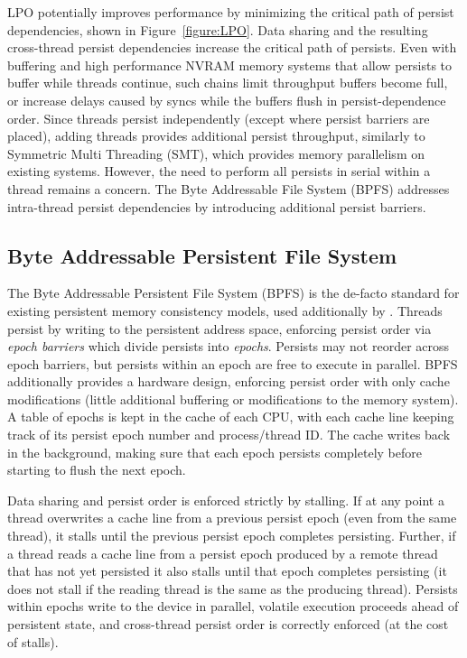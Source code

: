 
LPO potentially improves performance by minimizing the critical path of persist dependencies, shown in Figure~\ref{figure:LPO}.
Data sharing and the resulting cross-thread persist dependencies increase the critical path of persists.
Even with buffering and high performance NVRAM memory systems that allow persists to buffer while threads continue, such chains limit throughput buffers become full, or increase delays caused by syncs while the buffers flush in persist-dependence order.
Since threads persist independently (except where persist barriers are placed), adding threads provides additional persist throughput, similarly to Symmetric Multi Threading (SMT), which provides memory parallelism on existing systems.
However, the need to perform all persists in serial within a thread remains a concern.
The Byte Addressable File System (BPFS) addresses intra-thread persist dependencies by introducing additional persist barriers.

\subsection{Byte Addressable Persistent File System}
\label{sec:PMC:PersistenceModels:BPFS}

The Byte Addressable Persistent File System (BPFS) \cite{ConditNightingale09} is the de-facto standard for existing persistent memory consistency models, used additionally by \cite{CoburnCaulfield11, FangHsiao11, VenkataramanTolia11}.
Threads persist by writing to the persistent address space, enforcing persist order via \emph{epoch barriers} which divide persists into \emph{epochs}.
Persists may not reorder across epoch barriers, but persists within an epoch are free to execute in parallel.
BPFS additionally provides a hardware design, enforcing persist order with only cache modifications (little additional buffering or modifications to the memory system).
A table of epochs is kept in the cache of each CPU, with each cache line keeping track of its persist epoch number and process/thread ID.
The cache writes back in the background, making sure that each epoch persists completely before starting to flush the next epoch.

Data sharing and persist order is enforced strictly by stalling.
If at any point a thread overwrites a cache line from a previous persist epoch (even from the same thread), it stalls until the previous persist epoch completes persisting.
Further, if a thread reads a cache line from a persist epoch produced by a remote thread that has not yet persisted it also stalls until that epoch completes persisting (it does not stall if the reading thread is the same as the producing thread).
Persists within epochs write to the device in parallel, volatile execution proceeds ahead of persistent state, and cross-thread persist order is correctly enforced (at the cost of stalls).

